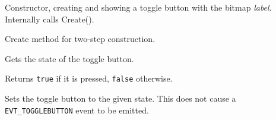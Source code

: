 Constructor, creating and showing a toggle button with the bitmap {\it label}.
Internally calls Create().

\label{wxbitmaptogglebuttoncreate}


Create method for two-step construction.

\label{wxbitmaptogglebuttongetvalue}


Gets the state of the toggle button.


Returns {\tt true} if it is pressed, {\tt false} otherwise.

\label{wxbitmaptogglebuttonsetvalue}


Sets the toggle button to the given state. This does not cause a
{\tt EVT\_TOGGLEBUTTON} event to be emitted.



